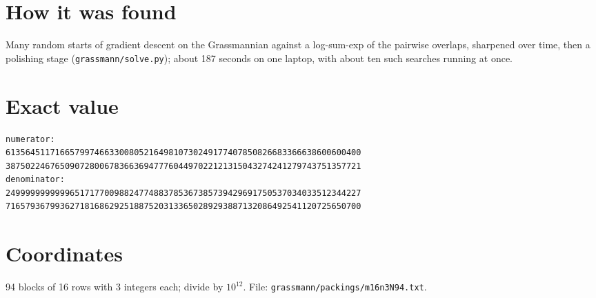 \documentclass[11pt,a4paper]{article}
\begin{document}
\section{How it was found}
Many random starts of gradient descent on the Grassmannian against a log-sum-exp of the pairwise overlaps, sharpened over time, then a polishing stage (\texttt{grassmann/solve.py}); about 187 seconds on one laptop, with about ten such searches running at once.


\appendix
\section{Exact value}
{\small
\begin{verbatim}
numerator:
613564511716657997466330080521649810730249177407850826683366638600600400
387502246765090728006783663694777604497022121315043274241279743751357721
denominator:
249999999999965171770098824774883785367385739429691750537034033512344227
716579367993627181686292518875203133650289293887132086492541120725650700
\end{verbatim}}

\section{Coordinates}
94 blocks of 16 rows with 3 integers each; divide by $10^{12}$. File: \texttt{grassmann/packings/m16n3N94.txt}.
{\tiny
\begin{multicols}{3}
\end{multicols}}
\end{document}
